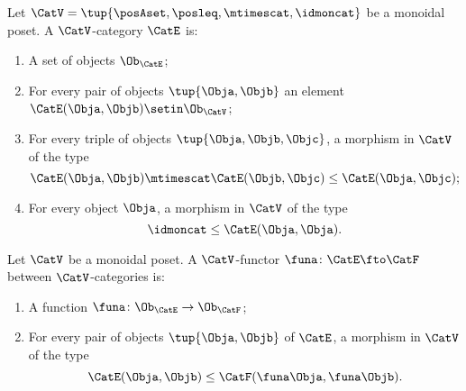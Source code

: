 \begin{ctdefinition}
    \label{def:enriched-cat-monoidal-poset}
    Let $\CatV = \tup{\posAset, \posleq, \mtimescat, \idmoncat}$ be a monoidal poset.
    A $\CatV$-category $\CatE$ is:

    \constit
    \begin{enumerate}
        \item A set of objects $\Ob_\CatE$;
        \item For every pair of objects $\tup{\Obja, \Objb}$ an element $\CatE(\Obja, \Objb) \setin \Ob_\CatV$;
        \item For every triple of objects $\tup{\Obja, \Objb, \Objc}$, a morphism in $\CatV$ of the type
              \begin{equation}
                  \CatE(\Obja, \Objb) \mtimescat \CatE(\Objb, \Objc) \leq \CatE(\Obja, \Objc);
              \end{equation}
        \item For every object $\Obja$, a morphism in $\CatV$ of the type
              \begin{equation}
                  \idmoncat \leq \CatE(\Obja, \Obja).
              \end{equation}
    \end{enumerate}
\end{ctdefinition}

\begin{ctdefinition}
    \label{def:functor-monoidal-poset-enriched}
    Let $\CatV$ be a monoidal poset.
    A $\CatV$-functor $\funa \colon \CatE \fto \CatF$ between $\CatV$-categories is:

    \constit
    \begin{enumerate}
        \item A function $\funa \colon \Ob_\CatE \to \Ob_\CatF$;
        \item For every pair of objects $\tup{\Obja, \Objb}$ of $\CatE$, a morphism in $\CatV$ of the type
              \begin{equation}
                  \CatE(\Obja, \Objb) \leq \CatF(\funa \Obja, \funa \Objb).
              \end{equation}
    \end{enumerate}
\end{ctdefinition}

